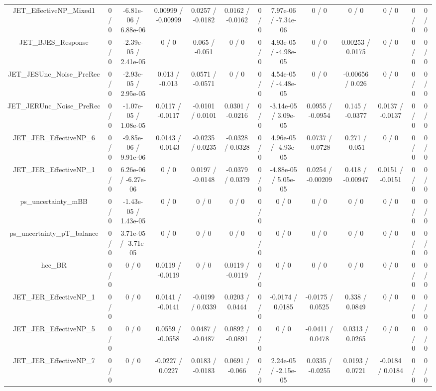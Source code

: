 \documentclass[10pt]{article}
\begin{document}
\begin{table}[htbp]
\begin{center}
\begin{tabular}{|c|c|c|c|c|c|c|c|c|c|c|c|c|}
  JET_EffectiveNP_Mixed1 & 0 / 0 & -6.81e-06 / 6.88e-06 & 0.00999 / -0.00999 & 0.0257 / -0.0182 & 0.0162 / -0.0162 & 0 / 0 & 7.97e-06 / -7.34e-06 & 0 / 0 & 0 / 0 & 0 / 0 & 0 / 0 & 0 / 0 \\ 
  JET_BJES_Response & 0 / 0 & -2.39e-05 / 2.41e-05 & 0 / 0 & 0.065 / -0.051 & 0 / 0 & 0 / 0 & 4.93e-05 / -4.98e-05 & 0 / 0 & 0.00253 / 0.0175 & 0 / 0 & 0 / 0 & 0 / 0 \\ 
  JET_JESUnc_Noise_PreRec & 0 / 0 & -2.93e-05 / 2.95e-05 & 0.013 / -0.013 & 0.0571 / -0.0571 & 0 / 0 & 0 / 0 & 4.54e-05 / -4.48e-05 & 0 / 0 & -0.00656 / 0.026 & 0 / 0 & 0 / 0 & 0 / 0 \\ 
  JET_JERUnc_Noise_PreRec & 0 / 0 & -1.07e-05 / 1.08e-05 & 0.0117 / -0.0117 & -0.0101 / 0.0101 & 0.0301 / -0.0216 & 0 / 0 & -3.14e-05 / 3.09e-05 & 0.0955 / -0.0954 & 0.145 / -0.0377 & 0.0137 / -0.0137 & 0 / 0 & 0 / 0 \\ 
  JET_JER_EffectiveNP_6 & 0 / 0 & -9.85e-06 / 9.91e-06 & 0.0143 / -0.0143 & -0.0235 / 0.0235 & -0.0328 / 0.0328 & 0 / 0 & 4.96e-05 / -4.93e-05 & 0.0737 / -0.0728 & 0.271 / -0.051 & 0 / 0 & 0 / 0 & 0 / 0 \\ 
  JET_JER_EffectiveNP_1 & 0 / 0 & 6.26e-06 / -6.27e-06 & 0 / 0 & 0.0197 / -0.0148 & -0.0379 / 0.0379 & 0 / 0 & -4.88e-05 / 5.05e-05 & 0.0254 / -0.00209 & 0.418 / -0.00947 & 0.0151 / -0.0151 & 0 / 0 & 0 / 0 \\ 
  ps_uncertainty_mBB & 0 / 0 & -1.43e-05 / 1.43e-05 & 0 / 0 & 0 / 0 & 0 / 0 & 0 / 0 & 0 / 0 & 0 / 0 & 0 / 0 & 0 / 0 & 0 / 0 & 0 / 0 \\ 
  ps_uncertainty_pT_balance & 0 / 0 & 3.71e-05 / -3.71e-05 & 0 / 0 & 0 / 0 & 0 / 0 & 0 / 0 & 0 / 0 & 0 / 0 & 0 / 0 & 0 / 0 & 0 / 0 & 0 / 0 \\ 
  hcc_BR & 0 / 0 & 0 / 0 & 0.0119 / -0.0119 & 0 / 0 & 0.0119 / -0.0119 & 0 / 0 & 0 / 0 & 0 / 0 & 0 / 0 & 0 / 0 & 0 / 0 & 0 / 0 \\ 
  JET_JER_EffectiveNP_1 & 0 / 0 & 0 / 0 & 0.0141 / -0.0141 & -0.0199 / 0.0339 & 0.0203 / 0.0444 & 0 / 0 & -0.0174 / 0.0185 & -0.0175 / 0.0525 & 0.338 / 0.0849 & 0 / 0 & 0 / 0 & 0 / 0 \\ 
  JET_JER_EffectiveNP_5 & 0 / 0 & 0 / 0 & 0.0559 / -0.0558 & 0.0487 / -0.0487 & 0.0892 / -0.0891 & 0 / 0 & 0 / 0 & -0.0411 / 0.0478 & 0.0313 / 0.0265 & 0 / 0 & 0 / 0 & 0 / 0 \\ 
  JET_JER_EffectiveNP_7 & 0 / 0 & 0 / 0 & -0.0227 / 0.0227 & 0.0183 / -0.0183 & 0.0691 / -0.066 & 0 / 0 & 2.24e-05 / -2.15e-05 & 0.0335 / -0.0255 & 0.0193 / 0.0721 & -0.0184 / 0.0184 & 0 / 0 & 0 / 0 \\ 

\end{tabular}
\end{center}
\end{table}
\end{document}
